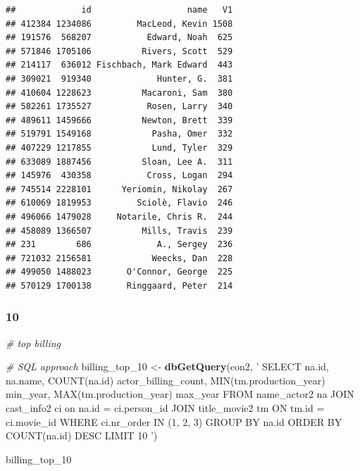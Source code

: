 \documentclass[]{article}
\newenvironment{Shaded}{\begin{snugshade}}{\end{snugshade}}
\newcommand{\KeywordTok}[1]{\textcolor[rgb]{0.13,0.29,0.53}{\textbf{{#1}}}}
\newcommand{\StringTok}[1]{\textcolor[rgb]{0.31,0.60,0.02}{{#1}}}
\newcommand{\CommentTok}[1]{\textcolor[rgb]{0.56,0.35,0.01}{\textit{{#1}}}}
\newcommand{\NormalTok}[1]{{#1}}
\begin{document}
\begin{verbatim}
##             id                   name   V1
## 412384 1234086         MacLeod, Kevin 1508
## 191576  568207           Edward, Noah  625
## 571846 1705106          Rivers, Scott  529
## 214117  636012 Fischbach, Mark Edward  443
## 309021  919340             Hunter, G.  381
## 410604 1228623          Macaroni, Sam  380
## 582261 1735527           Rosen, Larry  340
## 489611 1459666          Newton, Brett  339
## 519791 1549168            Pasha, Omer  332
## 407229 1217855            Lund, Tyler  329
## 633089 1887456          Sloan, Lee A.  311
## 145976  430358           Cross, Logan  294
## 745514 2228101      Yeriomin, Nikolay  267
## 610069 1819953         Sciolè, Flavio  246
## 496066 1479028     Notarile, Chris R.  244
## 458089 1366507          Mills, Travis  239
## 231        686             A., Sergey  236
## 721032 2156581            Weecks, Dan  228
## 499050 1488023       O'Connor, George  225
## 570129 1700138       Ringgaard, Peter  214
\end{verbatim}

\subsubsection{10}\label{section}

\begin{Shaded}
\begin{Highlighting}[]
\CommentTok{# top billing}

\CommentTok{# SQL approach}
\NormalTok{billing_top_10 <-}\StringTok{ }
\StringTok{  }\KeywordTok{dbGetQuery}\NormalTok{(con2, }\StringTok{'}
\StringTok{             SELECT na.id, na.name, COUNT(na.id) actor_billing_count, }
\StringTok{                MIN(tm.production_year) min_year, MAX(tm.production_year) max_year}
\StringTok{             FROM name_actor2 na JOIN cast_info2 ci on na.id = ci.person_id}
\StringTok{                JOIN title_movie2 tm ON tm.id = ci.movie_id}
\StringTok{             WHERE ci.nr_order IN (1, 2, 3)}
\StringTok{             GROUP BY na.id}
\StringTok{             ORDER BY COUNT(na.id) DESC}
\StringTok{             LIMIT 10}
\StringTok{             '}\NormalTok{)}

\NormalTok{billing_top_10}
\end{Highlighting}
\end{Shaded}
\end{document}
